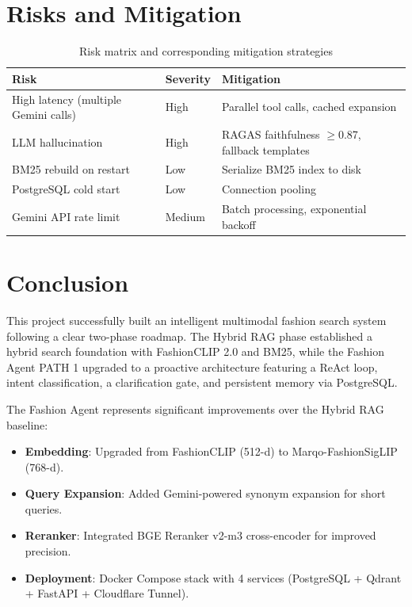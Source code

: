 \section{Risks and Mitigation}

\begin{table}[H]
\centering
\begin{tabular}{lll}
\toprule
\textbf{Risk} & \textbf{Severity} & \textbf{Mitigation}\\
\midrule
High latency (multiple Gemini calls) & High   & Parallel tool calls, cached expansion\\
LLM hallucination                    & High   & RAGAS faithfulness $\geq$0.87, fallback templates\\
BM25 rebuild on restart              & Low    & Serialize BM25 index to disk\\
PostgreSQL cold start                & Low    & Connection pooling\\
Gemini API rate limit                & Medium & Batch processing, exponential backoff\\
\bottomrule
\end{tabular}
\caption{Risk matrix and corresponding mitigation strategies}
\end{table}

\section{Conclusion}
This project successfully built an intelligent multimodal fashion search system following a clear two-phase roadmap. The Hybrid RAG phase established a hybrid search foundation with FashionCLIP 2.0 and BM25, while the Fashion Agent PATH 1 upgraded to a proactive architecture featuring a ReAct loop, intent classification, a clarification gate, and persistent memory via PostgreSQL.

The Fashion Agent represents significant improvements over the Hybrid RAG baseline:
\begin{itemize}
    \item \textbf{Embedding}: Upgraded from FashionCLIP (512-d) to Marqo-FashionSigLIP (768-d).
    \item \textbf{Query Expansion}: Added Gemini-powered synonym expansion for short queries.
    \item \textbf{Reranker}: Integrated BGE Reranker v2-m3 cross-encoder for improved precision.
    \item \textbf{Deployment}: Docker Compose stack with 4 services (PostgreSQL + Qdrant + FastAPI + Cloudflare Tunnel).
\end{itemize}

